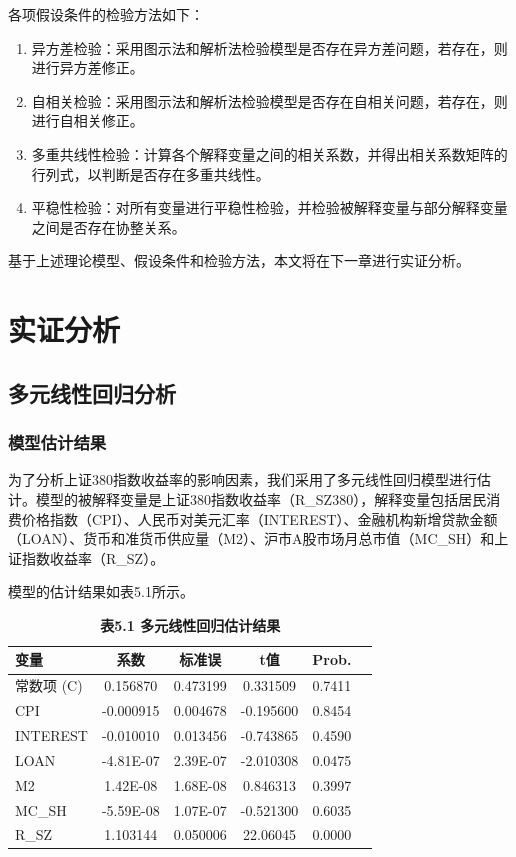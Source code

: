 \documentclass[12pt, a4paper]{article}
\numberwithin{equation}{section}
\begin{document}
各项假设条件的检验方法如下：
\begin{enumerate}[label=\arabic*)]
    \item 异方差检验：采用图示法和解析法检验模型是否存在异方差问题，若存在，则进行异方差修正。
    \item 自相关检验：采用图示法和解析法检验模型是否存在自相关问题，若存在，则进行自相关修正。
    \item 多重共线性检验：计算各个解释变量之间的相关系数，并得出相关系数矩阵的行列式，以判断是否存在多重共线性。
    \item 平稳性检验：对所有变量进行平稳性检验，并检验被解释变量与部分解释变量之间是否存在协整关系。
\end{enumerate}

基于上述理论模型、假设条件和检验方法，本文将在下一章进行实证分析。

\newpage
\section{实证分析}
\subsection{多元线性回归分析}
\subsubsection{模型估计结果}
为了分析上证380指数收益率的影响因素，我们采用了多元线性回归模型进行估计。模型的被解释变量是上证380指数收益率（R\_SZ380），解释变量包括居民消费价格指数（CPI）、人民币对美元汇率（INTEREST）、金融机构新增贷款金额（LOAN）、货币和准货币供应量（M2）、沪市A股市场月总市值（MC\_SH）和上证指数收益率（R\_SZ）。

模型的估计结果如表5.1所示。

\begin{table}[h!]
    \centering
    \captionsetup{labelformat=empty}
    \caption{\textbf{\fontsize{9pt}{11pt}\selectfont 表5.1 多元线性回归估计结果}}
    \begin{tabular}{lccccc}
        \toprule
        变量       & 系数        & 标准误      & t值        & Prob.  \\
        \midrule
        常数项 (C)  & 0.156870  & 0.473199 & 0.331509  & 0.7411 \\
        CPI      & -0.000915 & 0.004678 & -0.195600 & 0.8454 \\
        INTEREST & -0.010010 & 0.013456 & -0.743865 & 0.4590 \\
        LOAN     & -4.81E-07 & 2.39E-07 & -2.010308 & 0.0475 \\
        M2       & 1.42E-08  & 1.68E-08 & 0.846313  & 0.3997 \\
        MC\_SH   & -5.59E-08 & 1.07E-07 & -0.521300 & 0.6035 \\
        R\_SZ    & 1.103144  & 0.050006 & 22.06045  & 0.0000 \\
        \bottomrule
    \end{tabular}
\end{table}
\end{document}
